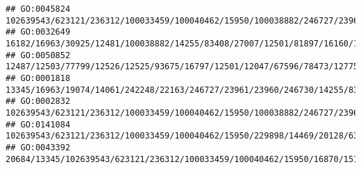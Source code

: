 \documentclass[
]{article}
\begin{document}
\begin{verbatim}
## GO:0045824                                                                                                                                                                                                                                                                            102639543/623121/236312/100033459/100040462/15950/100038882/246727/23961/23960/246730/80782/16643/434341/80861/547253/21354/21355
## GO:0032649                                                                                                                                                                                                                                                                                       16182/16963/30925/12481/100038882/14255/83408/27007/12501/81897/16160/12775/72049/57757/110558/12475/60533/58205/20371
## GO:0050852                                                                                                                                                                                                                                                                               12487/12503/77799/12526/12525/93675/16797/12501/12047/67596/78473/12775/547431/100038862/632126/624681/74556/20371/20400/12229
## GO:0001818                                                                                                                                                                                                                13345/16963/19074/14061/242248/22163/246727/23961/23960/246730/14255/83408/20128/15930/69550/16160/327959/12775/80861/110168/81799/54483/11815/100043314/57757/60533/58205/20371/213439/12229
## GO:0002832                                                                                                                                                                                                                                                                102639543/623121/236312/100033459/100040462/15950/100038882/246727/23961/23960/246730/80782/16643/434341/80861/547253/21354/21355/60533/20371
## GO:0141084                                                                                                                                                                                                                                                                                                               102639543/623121/236312/100033459/100040462/15950/229898/14469/20128/637515/54483/224762/12229
## GO:0043392                                                                                                                                                                                                                                                                                                                        20684/13345/102639543/623121/236312/100033459/100040462/15950/16870/15110/20666/17702

\end{verbatim}
\end{document}
